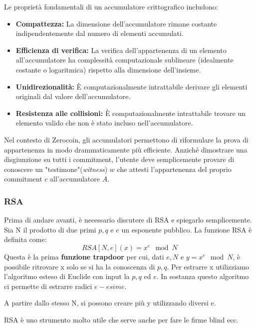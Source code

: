 Le proprietà fondamentali di un accumulatore crittografico includono:
\begin{itemize}
    \item \textbf{Compattezza:} La dimensione dell'accumulatore rimane costante indipendentemente dal numero di elementi accumulati.
    \item \textbf{Efficienza di verifica:} La verifica dell'appartenenza di un elemento all'accumulatore ha complessità computazionale sublineare (idealmente costante o logaritmica) rispetto alla dimensione dell'insieme.
    \item \textbf{Unidirezionalità:} È computazionalmente intrattabile derivare gli elementi originali dal valore dell'accumulatore.
    \item \textbf{Resistenza alle collisioni:} È computazionalmente intrattabile trovare un elemento valido che non è stato incluso nell'accumulatore.
\end{itemize}

Nel contesto di Zerocoin, gli accumulatori permettono di riformulare la prova di appartenenza in modo drammaticamente più efficiente. Anziché dimostrare una disgiunzione su tutti i commitment, l'utente deve semplicemente provare di conoscere un "testimone"(\textit{witness}) $w$ che attesti l'appartenenza del proprio commitment $c$ all'accumulatore $A$.

\subsubsection{RSA}
Prima di andare avanti, è necessario discutere di RSA e spiegarlo semplicemente. Sia N il prodotto di due primi $p,q$ e $e$ un esponente pubblico. La funzione RSA è definita come:
\[RSA[N, e](x) = x^e \mod N\]
Questa è la prima \textbf{funzione trapdoor} per cui, dati $e,N$ e $y =x^e \mod N$, è possibile ritrovare x solo se si ha la conoscenza di $p,q$.
Per estrarre x utilizziamo l'algoritmo esteso di Euclide con input la $p, q$ ed $e$. In sostanza questo algoritmo ci permette di estrarre radici $e-esime$. 

A partire dallo stesso N, si possono creare più y utilizzando diversi e.

RSA è uno strumento molto utile che serve anche per fare le firme blind ecc. 
